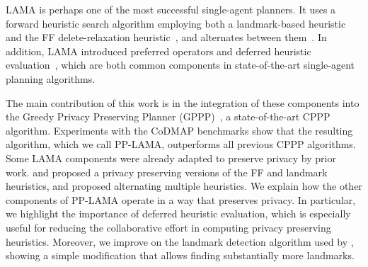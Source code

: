 \documentclass[letterpaper]{article}
\theoremstyle{definition}
\begin{document}
LAMA is perhaps one of the most successful single-agent planners. 
It uses a forward heuristic search algorithm employing both a landmark-based heuristic~\citep{richter2008landmarks} and the FF delete-relaxation heuristic~\citep{hoffmann2001ff}, and alternates between them~\citep{roger2010theMore}. In addition, LAMA introduced preferred operators and deferred heuristic evaluation~\citep{richter2009preferred}, which are both common components in state-of-the-art single-agent planning algorithms. 

The main contribution of this work is in the integration of these components into the Greedy Privacy Preserving Planner (GPPP)~\citep{maliah2014privacyPreserving}, a state-of-the-art CPPP algorithm. Experiments with the CoDMAP benchmarks show that the resulting algorithm, which we call PP-LAMA, outperforms all previous CPPP algorithms. 
Some LAMA components were already adapted to preserve privacy by prior work. \cite{vstolba2014relaxation} and \cite{maliah2014privacyPreserving} 
proposed a privacy preserving versions of the FF and landmark heuristics, and \cite{torreno2015global} proposed alternating multiple heuristics. 
We explain how the other components of PP-LAMA operate in a way that preserves privacy. 
In particular, we highlight the importance of deferred heuristic evaluation, which is especially useful for reducing the collaborative effort in computing privacy preserving heuristics. Moreover, we improve on the landmark detection algorithm used by \cite{maliah2014privacyPreserving}, showing a simple modification that allows finding substantially more landmarks. %
\end{document}
